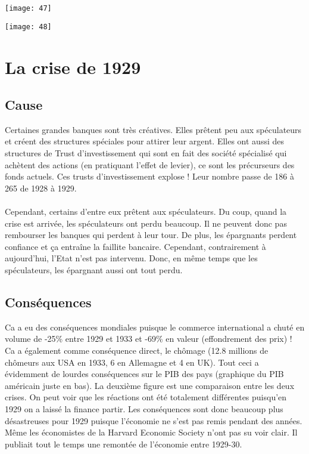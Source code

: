 \begin{minipage}{0.5\textwidth}
	\begin{flushleft}
		\texttt{[image: 47]}
	\end{flushleft}
\end{minipage}
\begin{minipage}{0.5\textwidth}
	\begin{center}
		\texttt{[image: 48]}
	\end{center}
\end{minipage}

\section{La crise de 1929}

\subsection{Cause}
Certaines grandes banques sont très créatives. Elles prêtent peu aux spéculateurs et créent des structures spéciales pour attirer leur argent. Elles ont aussi des structures de Trust d'investissement qui sont en fait des société spécialisé qui achètent des actions (en pratiquant l'effet de levier), ce sont les précurseurs des fonds actuels. Ces trusts d'investissement explose ! Leur nombre passe de 186 à 265 de 1928 à 1929.
\\\\
Cependant, certains d'entre eux prêtent aux spéculateurs. Du coup, quand la crise est arrivée, les spéculateurs ont perdu beaucoup. Il ne peuvent donc pas rembourser les banques qui perdent à leur tour. De plus, les épargnants perdent confiance et ça entraîne la faillite bancaire. Cependant, contrairement à aujourd'hui, l'Etat n'est pas intervenu. Donc, en même temps que les spéculateurs, les épargnant aussi ont tout perdu.

\subsection{Conséquences}
Ca a eu des conséquences mondiales puisque le commerce international a chuté en volume de -25\% entre 1929 et 1933 et -69\% en valeur (effondrement des prix) ! Ca a également comme conséquence direct, le chômage (12.8 millions de chômeurs aux USA en 1933, 6 en Allemagne et 4 en UK). Tout ceci a évidemment de lourdes conséquences sur le PIB des pays (graphique du PIB américain juste en bas). La deuxième figure est une comparaison entre les deux crises. On peut voir que les réactions ont été totalement différentes puisqu'en 1929 on a laissé la finance partir. Les conséquences sont donc beaucoup plus désastreuses pour 1929 puisque l'économie ne s'est pas remis pendant des années. Même les économistes de la Harvard Economic Society n'ont pas su voir clair. Il publiait tout le temps une remontée de l'économie entre 1929-30. \\

